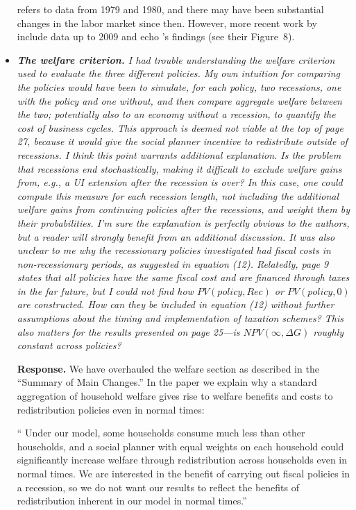 \documentclass[12pt,letterpaper,english]{article}
\begin{document}
\begin{itemize}
	\citet{mincer1991education} refers to data from 1979 and 1980, and there may have been substantial changes in the labor market since then. However, more recent work by \citet{elsby2010labor} include data up to 2009 and echo \citeauthor{mincer1991education}'s findings (see their Figure~8).

	\item \textit{\textbf{The welfare criterion.} I had trouble understanding the welfare criterion used to evaluate the three different policies. My own intuition for comparing the policies would have been to simulate, for each policy, two recessions, one with the policy and one without, and then compare aggregate	welfare between the two; potentially also to an economy without a recession, to quantify the cost of business cycles. This approach is deemed not viable at the top of page 27, because		it would give the social planner incentive to redistribute outside of recessions. I think this point warrants additional explanation. Is the problem that recessions end stochastically, making it difficult to exclude welfare gains from, e.g., a UI extension after the recession is over? In this case, one could compute this measure for each recession length, not including the additional welfare gains from continuing policies after the recessions, and weight them by their probabilities. I’m sure the explanation is perfectly obvious to the authors, but a reader will strongly benefit from an additional discussion. It was also unclear to me why the recessionary policies investigated had fiscal costs in non-recessionary periods, as suggested	in equation (12). Relatedly, page 9 states that all policies have the same fiscal cost and are financed through taxes in the far future, but I could not find how $PV(policy,Rec)$ 	or $PV(policy, 0)$ are constructed. How can they be included in equation (12) without further	assumptions about the timing and implementation of taxation schemes? This also matters for the results presented on page 25—is $NPV(\infty,\Delta G)$ roughly constant across policies?}

	\noindent \textbf{Response.} We have overhauled the welfare section as described in the ``Summary of Main Changes.'' In the paper we explain why a standard aggregation of household welfare gives rise to welfare benefits and costs to redistribution policies even in normal times:
	
	`` Under our model, some households consume much less than other households, and a social planner with equal weights on each household could significantly increase welfare through redistribution across households even in normal times. We are interested in the benefit of carrying out fiscal policies in a recession, so we do not want our results to reflect the benefits of redistribution inherent in our model in normal times.''
	

\end{itemize}
\end{document}

